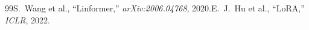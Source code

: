 \begin{thebibliography}{99}S.~Wang et al., ``Linformer,'' \emph{arXiv:2006.04768}, 2020.E.~J.~Hu et al., ``LoRA,'' \emph{ICLR}, 2022.\end{thebibliography}
